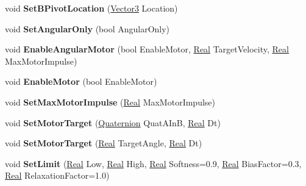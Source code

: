 \begin{DoxyCompactItemize}
\item 
\hypertarget{classphys_1_1HingeConstraint_a6891924d55abb8a68195b4f5b08420b4}{
void {\bfseries SetBPivotLocation} (\hyperlink{classphys_1_1Vector3}{Vector3} Location)}
\label{d3/d0d/classphys_1_1HingeConstraint_a6891924d55abb8a68195b4f5b08420b4}

\item 
\hypertarget{classphys_1_1HingeConstraint_af0c9120692422de58ba6d442a01f22b6}{
void {\bfseries SetAngularOnly} (bool AngularOnly)}
\label{d3/d0d/classphys_1_1HingeConstraint_af0c9120692422de58ba6d442a01f22b6}

\item 
\hypertarget{classphys_1_1HingeConstraint_a43fd81df8530a1bcee46fd52f8b47a28}{
void {\bfseries EnableAngularMotor} (bool EnableMotor, \hyperlink{namespacephys_af7eb897198d265b8e868f45240230d5f}{Real} TargetVelocity, \hyperlink{namespacephys_af7eb897198d265b8e868f45240230d5f}{Real} MaxMotorImpulse)}
\label{d3/d0d/classphys_1_1HingeConstraint_a43fd81df8530a1bcee46fd52f8b47a28}

\item 
\hypertarget{classphys_1_1HingeConstraint_a943ff31d46129143b66744abbb46086f}{
void {\bfseries EnableMotor} (bool EnableMotor)}
\label{d3/d0d/classphys_1_1HingeConstraint_a943ff31d46129143b66744abbb46086f}

\item 
\hypertarget{classphys_1_1HingeConstraint_a944b8ade0a8a1f4853566bc17ebb23ac}{
void {\bfseries SetMaxMotorImpulse} (\hyperlink{namespacephys_af7eb897198d265b8e868f45240230d5f}{Real} MaxMotorImpulse)}
\label{d3/d0d/classphys_1_1HingeConstraint_a944b8ade0a8a1f4853566bc17ebb23ac}

\item 
\hypertarget{classphys_1_1HingeConstraint_a9a9b914a2a64f3cbc09700c61fcdce41}{
void {\bfseries SetMotorTarget} (\hyperlink{classphys_1_1Quaternion}{Quaternion} QuatAInB, \hyperlink{namespacephys_af7eb897198d265b8e868f45240230d5f}{Real} Dt)}
\label{d3/d0d/classphys_1_1HingeConstraint_a9a9b914a2a64f3cbc09700c61fcdce41}

\item 
\hypertarget{classphys_1_1HingeConstraint_a6080b88f14312a509fe089f7c893e62d}{
void {\bfseries SetMotorTarget} (\hyperlink{namespacephys_af7eb897198d265b8e868f45240230d5f}{Real} TargetAngle, \hyperlink{namespacephys_af7eb897198d265b8e868f45240230d5f}{Real} Dt)}
\label{d3/d0d/classphys_1_1HingeConstraint_a6080b88f14312a509fe089f7c893e62d}

\item 
\hypertarget{classphys_1_1HingeConstraint_acabfc495ddd1da39fc1709be32923d1b}{
void {\bfseries SetLimit} (\hyperlink{namespacephys_af7eb897198d265b8e868f45240230d5f}{Real} Low, \hyperlink{namespacephys_af7eb897198d265b8e868f45240230d5f}{Real} High, \hyperlink{namespacephys_af7eb897198d265b8e868f45240230d5f}{Real} Softness=0.9, \hyperlink{namespacephys_af7eb897198d265b8e868f45240230d5f}{Real} BiasFactor=0.3, \hyperlink{namespacephys_af7eb897198d265b8e868f45240230d5f}{Real} RelaxationFactor=1.0)}
\label{d3/d0d/classphys_1_1HingeConstraint_acabfc495ddd1da39fc1709be32923d1b}


\end{DoxyCompactItemize}
